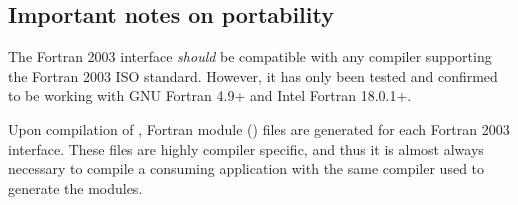 \subsection{Important notes on portability}\label{ss:f2003_portability}

The {\sundials} Fortran 2003 interface \textit{should} be compatible with any compiler
supporting the Fortran 2003 ISO standard. However, it has only been tested and confirmed
to be working with GNU Fortran 4.9+ and Intel Fortran 18.0.1+.

Upon compilation of {\sundials}, Fortran module () files are generated
for each Fortran 2003 interface. These files are highly compiler specific, and
thus it is almost always necessary to compile a consuming application with the
same compiler used to generate the modules.
